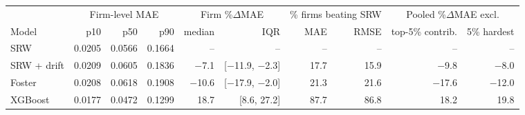 \begin{tabular}{lrrr rr rr rr}
\toprule
& \multicolumn{3}{c}{Firm-level MAE} & \multicolumn{2}{c}{Firm \%$\Delta$MAE} & \multicolumn{2}{c}{\% firms beating SRW} & \multicolumn{2}{c}{Pooled \%$\Delta$MAE excl.} \\
\cmidrule(lr){2-4}\cmidrule(lr){5-6}\cmidrule(lr){7-8}\cmidrule(lr){9-10}
Model & p10 & p50 & p90 & median & IQR & MAE & RMSE & top-5\% contrib. & 5\% hardest \\
\midrule
SRW & 0.0205 & 0.0566 & 0.1664 & -- & -- & -- & -- & -- & -- \\
SRW + drift & 0.0209 & 0.0605 & 0.1836 & $-$7.1 & [$-$11.9, $-$2.3] & 17.7 & 15.9 & $-$9.8 & $-$8.0 \\
Foster & 0.0208 & 0.0618 & 0.1908 & $-$10.6 & [$-$17.9, $-$2.0] & 21.3 & 21.6 & $-$17.6 & $-$12.0 \\
XGBoost & 0.0177 & 0.0472 & 0.1299 & 18.7 & [8.6, 27.2] & 87.7 & 86.8 & 18.2 & 19.8 \\
\bottomrule
\end{tabular}
